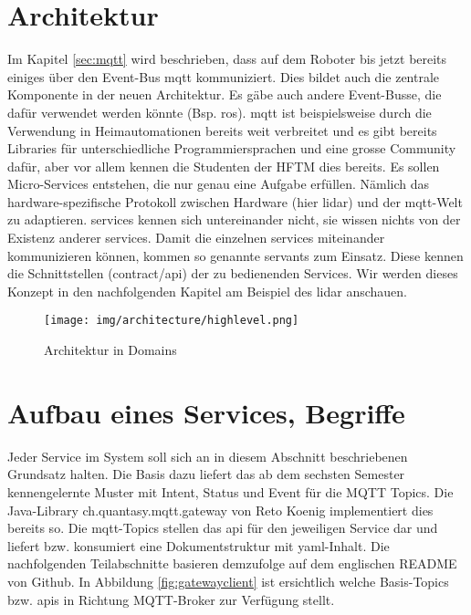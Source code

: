 \section{Architektur}
Im Kapitel \ref{sec:mqtt} wird beschrieben, dass auf dem Roboter bis jetzt bereits einiges über den Event-Bus \acrshort{mqtt} kommuniziert. Dies bildet auch die zentrale Komponente in der neuen Architektur. Es gäbe auch andere Event-Busse, die dafür verwendet werden könnte (Bsp. \acrshort{ros}). \acrshort{mqtt} ist beispielsweise durch die Verwendung in Heimautomationen bereits weit verbreitet und es gibt bereits Libraries für unterschiedliche Programmiersprachen und eine grosse Community dafür, aber vor allem kennen die Studenten der HFTM dies bereits. Es sollen Micro-Services entstehen, die nur genau eine Aufgabe erfüllen. Nämlich das hardware-spezifische Protokoll zwischen Hardware (hier \acrshort{lidar}) und der \acrshort{mqtt}-Welt zu adaptieren. \Glspl{service} kennen sich untereinander nicht, sie wissen nichts von der Existenz anderer \glspl{service}. Damit die einzelnen \Glspl{service} miteinander kommunizieren können, kommen so genannte \Glspl{servant} zum Einsatz. Diese kennen die Schnittstellen (\gls{contract}/\acrshort{api}) der zu bedienenden Services. Wir werden dieses Konzept in den nachfolgenden Kapitel am Beispiel des \acrshort{lidar} anschauen.

\begin{figure}[H]
	\centering
	\texttt{[image: img/architecture/highlevel.png]}
	\caption{Architektur in Domains}
	\label{fig:architecture_highlevel}
\end{figure}





\section{Aufbau eines Services, Begriffe}
Jeder Service im System soll sich an in diesem Abschnitt beschriebenen Grundsatz halten. Die Basis dazu liefert das ab dem sechsten Semester kennengelernte Muster mit Intent, Status und Event für die MQTT Topics. Die Java-Library ch.quantasy.mqtt.gateway\cite{ch.quantasy.mqtt.gateway} von Reto Koenig implementiert dies bereits so. Die \acrshort{mqtt}-Topics stellen das \acrshort{api} für den jeweiligen Service dar und liefert bzw. konsumiert eine Dokumentstruktur mit \acrshort{yaml}-Inhalt. Die nachfolgenden Teilabschnitte basieren demzufolge auf dem englischen README von Github\cite{ch.quantasy.mqtt.gateway}. In Abbildung \ref{fig:gatewayclient} ist ersichtlich welche Basis-Topics bzw. \acrshort{api}s in Richtung MQTT-Broker zur Verfügung stellt.

